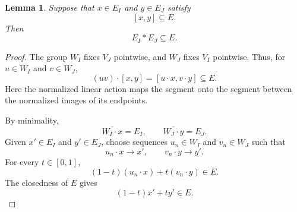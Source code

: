 \documentclass[11pt,reqno]{amsart}
\theoremstyle{plain}
\newtheorem{lemma}[theorem]{Lemma}
\theoremstyle{definition}
\theoremstyle{remark}
\numberwithin{equation}{section}
\begin{document}
\begin{lemma}\label{lem:one-segment-suffices}
Suppose that $x\in E_I$ and $y\in E_J$ satisfy
\[
[x,y]\subseteq E.
\]
Then
\[
E_I*E_J\subseteq E.
\]
\end{lemma}

\begin{proof}
The group $W_I$ fixes $V_J$ pointwise, and $W_J$ fixes $V_I$
pointwise. Thus, for $u\in W_I$ and $v\in W_J$,
\[
(uv)\cdot[x,y]=[u\cdot x,v\cdot y]\subseteq E.
\]
Here the normalized linear action maps the segment onto the
segment between the normalized images of its endpoints.

By minimality,
\[
\overline{W_I\cdot x}=E_I,
\qquad
\overline{W_J\cdot y}=E_J.
\]
Given $x'\in E_I$ and $y'\in E_J$, choose sequences
$u_n\in W_I$ and $v_n\in W_J$ such that
\[
u_n\cdot x\longrightarrow x',
\qquad
v_n\cdot y\longrightarrow y'.
\]
For every $t\in[0,1]$,
\[
(1-t)(u_n\cdot x)+t(v_n\cdot y)\in E.
\]
The closedness of $E$ gives
\[
(1-t)x'+ty'\in E.
\]
\end{proof}
\end{document}
